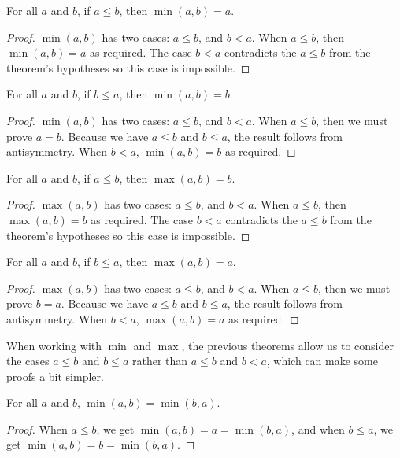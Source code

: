 \documentclass[../math.tex]{subfiles}
\begin{document}
\begin{theorem}
    For all $a$ and $b$, if $a \leq b$, then $\min(a, b) = a$.
\end{theorem}
\begin{proof}
    $\min(a, b)$ has two cases: $a \leq b$, and $b < a$.  When $a \leq b$, then
    $\min(a, b) = a$ as required.  The case $b < a$ contradicts the $a \leq b$
    from the theorem's hypotheses so this case is impossible.
\end{proof}

\begin{theorem}
    For all $a$ and $b$, if $b \leq a$, then $\min(a, b) = b$.
\end{theorem}
\begin{proof}
    $\min(a, b)$ has two cases: $a \leq b$, and $b < a$.  When $a \leq b$, then
    we must prove $a = b$.  Because we have $a \leq b$ and $b \leq a$, the
    result follows from antisymmetry.  When $b < a$, $\min(a, b) = b$ as
    required.
\end{proof}

\begin{theorem}
    For all $a$ and $b$, if $a \leq b$, then $\max(a, b) = b$.
\end{theorem}
\begin{proof}
    $\max(a, b)$ has two cases: $a \leq b$, and $b < a$.  When $a \leq b$, then
    $\max(a, b) = b$ as required.  The case $b < a$ contradicts the $a \leq b$
    from the theorem's hypotheses so this case is impossible.
\end{proof}

\begin{theorem}
    For all $a$ and $b$, if $b \leq a$, then $\max(a, b) = a$.
\end{theorem}
\begin{proof}
    $\max(a, b)$ has two cases: $a \leq b$, and $b < a$.  When $a \leq b$, then
    we must prove $b = a$.  Because we have $a \leq b$ and $b \leq a$, the
    result follows from antisymmetry.  When $b < a$, $\max(a, b) = a$ as
    required.
\end{proof}

When working with $\min$ and $\max$, the previous theorems allow us to consider
the cases $a \leq b$ and $b \leq a$ rather than $a \leq b$ and $b < a$, which
can make some proofs a bit simpler.

\begin{theorem} \label{min-comm}
    For all $a$ and $b$, $\min(a, b) = \min(b, a)$.
\end{theorem}
\begin{proof}
    When $a \leq b$, we get $\min(a, b) = a = \min(b, a)$, and when $b \leq a$,
    we get $\min(a, b) = b = \min(b, a)$.
\end{proof}
\end{document}

